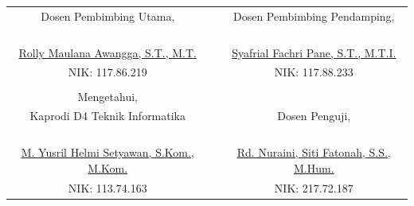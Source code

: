 \begin{pengesahan}
\begin{table}[h]
	\begin{tabular}{ccc}
		Dosen Pembimbing Utama,                  &                      & Dosen Pembimbing Pendamping,       \\
		&                      &                                    \\
		&                      &                                    \\
		&                      &                                    \\
		&                      &                                    \\
		\underline{Rolly Maulana Awangga, S.T., M.T.}        &                      & \underline{Syafrial Fachri Pane, S.T., M.T.I.} \\
		NIK: 117.86.219                          &                      & NIK: 117.88.233                    \\
		\multicolumn{1}{l}{}                     & \multicolumn{1}{l}{} & \multicolumn{1}{l}{}               \\
		Mengetahui,                              &                      &                                    \\
		Kaprodi D4 Teknik Informatika            &                      & Dosen Penguji,                     \\
		&                      &                                    \\
		&                      &                                    \\
		&                      &                                    \\
		&                      &                                    \\
		\underline{M. Yusril Helmi Setyawan, S.Kom., M.Kom.} &                      & \underline{Rd. Nuraini, Siti Fatonah, S.S., M.Hum.}    \\
		NIK: 113.74.163                          &                      & NIK: 217.72.187                   
	\end{tabular}
\end{table}

\end{pengesahan}

